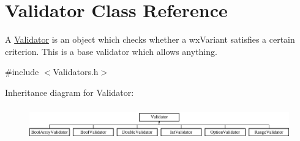 \hypertarget{class_validator}{}\section{Validator Class Reference}
\label{class_validator}


A \hyperlink{class_validator}{Validator} is an object which checks whether a wx\+Variant satisfies a certain criterion. This is a base validator which allows anything.  




{\ttfamily \#include $<$Validators.\+h$>$}

Inheritance diagram for Validator\+:\begin{figure}[H]
\begin{center}
\leavevmode
\includegraphics[height=1.447028cm]{class_validator}
\end{center}
\end{figure}
